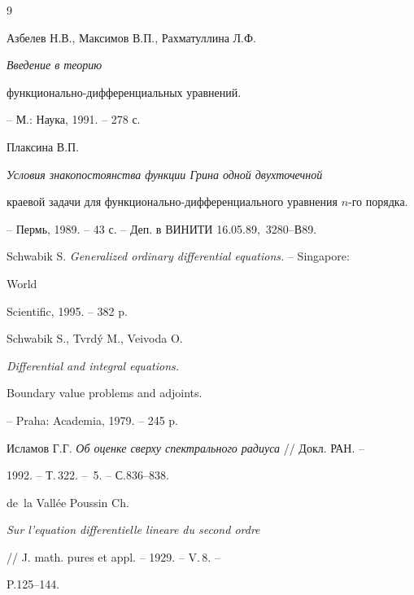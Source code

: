  


\begin{thebibliography}{9} 


 




Азбелев Н.В., Максимов В.П., Рахматуллина Л.Ф. {\em Введение в теорию 


функционально-дифференциальных уравнений.} -- М.: Наука, 1991. -- 278 с. 


 




Плаксина В.П. {\em Условия знакопостоянства функции Грина одной двухточечной 


краевой задачи для функционально-дифференциального уравнения $n$-го порядка.} 


-- Пермь, 1989. -- 43 с. -- Деп. в ВИНИТИ 16.05.89, \No\,3280--В89. 


 




Schwabik S. {\em Generalized ordinary differential equations.} -- Singapore:


World 


Scientific, 1995. -- 382 p. 


 




Schwabik S., Tvrd\'y M., Veivoda O. {\em Differential and integral equations. 


Boundary value problems and adjoints.} -- Praha: Academia, 1979. -- 245 p. 


 




Исламов Г.Г. {\em Об оценке сверху спектрального радиуса} // Докл. РАН. -- 


1992. -- Т.\,322. -- \No\,5. -- С.836--838. 


 




de~la Vall\'ee Poussin Ch.


{\em Sur l'equation differentielle lineare du second ordre}


// J. math. pures et appl. -- 1929. -- V.\,8. -- 


P.125--144. 



\end{thebibliography}
